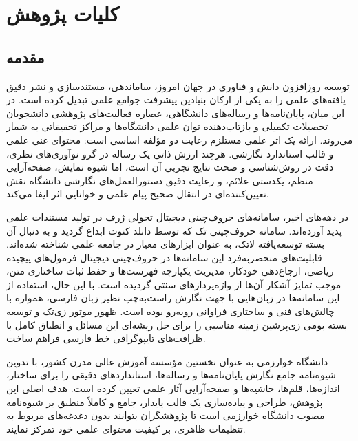 
\chapter{کلیات پژوهش}
\label{chap:intro}

\section{مقدمه}
\label{sec:ch1_intro}

توسعه روزافزون دانش و فناوری در جهان امروز، ساماندهی، مستندسازی و نشر دقیق یافته‌های علمی را به یکی از ارکان بنیادین پیشرفت جوامع علمی تبدیل کرده است. در این میان، پایان‌نامه‌ها و رساله‌های دانشگاهی، عصاره فعالیت‌های پژوهشی دانشجویان تحصیلات تکمیلی و بازتاب‌دهنده توان علمی دانشگاه‌ها و مراکز تحقیقاتی به شمار می‌روند. ارائه یک اثر علمی مستلزم رعایت دو مؤلفه اساسی است: محتوای غنی علمی و قالب استاندارد نگارشی. هرچند ارزش ذاتی یک رساله در گرو نوآوری‌های نظری، دقت در روش‌شناسی و صحت نتایج تجربی آن است، اما شیوه نمایش، صفحه‌آرایی منظم، یکدستی علائم، و رعایت دقیق دستورالعمل‌های نگارشی دانشگاه نقش تعیین‌کننده‌ای در انتقال صحیح پیام علمی و خوانایی اثر ایفا می‌کند.

در دهه‌های اخیر، سامانه‌های حروف‌چینی دیجیتال تحولی ژرف در تولید مستندات علمی پدید آورده‌اند. سامانه حروف‌چینی تک که توسط دانلد کنوت ابداع گردید و به دنبال آن بسته توسعه‌یافته لاتک، به عنوان ابزارهای معیار در جامعه علمی شناخته شده‌اند. قابلیت‌های منحصر‌به‌فرد این سامانه‌ها در حروف‌چینی دیجیتال فرمول‌های پیچیده ریاضی، ارجاع‌دهی خودکار، مدیریت یکپارچه فهرست‌ها و حفظ ثبات ساختاری متن، موجب تمایز آشکار آن‌ها از واژه‌پردازهای سنتی گردیده است. با این حال، استفاده از این سامانه‌ها در زبان‌هایی با جهت نگارش راست‌به‌چپ نظیر زبان فارسی، همواره با چالش‌های فنی و ساختاری فراوانی روبه‌رو بوده است. ظهور موتور زی‌تک و توسعه بسته بومی زی‌پرشین زمینه مناسبی را برای حل ریشه‌ای این مسائل و انطباق کامل با ظرافت‌های تایپوگرافی خط فارسی فراهم ساخت.

دانشگاه خوارزمی به عنوان نخستین مؤسسه آموزش عالی مدرن کشور، با تدوین شیوه‌نامه جامع نگارش پایان‌نامه‌ها و رساله‌ها، استانداردهای دقیقی را برای ساختار، اندازه‌ها، قلم‌ها، حاشیه‌ها و صفحه‌آرایی آثار علمی تعیین کرده است. هدف اصلی این پژوهش، طراحی و پیاده‌سازی یک قالب پایدار، جامع و کاملاً منطبق بر شیوه‌نامه مصوب دانشگاه خوارزمی است تا پژوهشگران بتوانند بدون دغدغه‌های مربوط به تنظیمات ظاهری، بر کیفیت محتوای علمی خود تمرکز نمایند.

